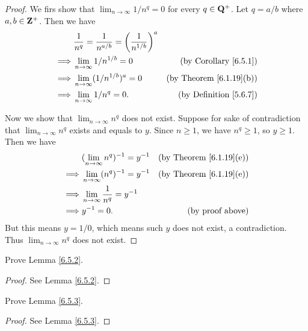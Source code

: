 \begin{proof}
    We firs show that \(\lim_{n \to \infty} 1 / n^q = 0\) for every \(q \in \mathbf{Q}^+\).
    Let \(q = a / b\) where \(a, b \in \mathbf{Z}^+\).
    Then we have
    \begin{align*}
                 & \frac{1}{n^q} = \frac{1}{n^{a / b}} = \bigg(\frac{1}{n^{1 / b}}\bigg)^a                                       \\
        \implies & \lim_{n \to \infty} 1 / n^{1 / b} = 0                                   & \text{(by Corollary \ref{6.5.1})}   \\
        \implies & \lim_{n \to \infty} (1 / n^{1 / b})^a = 0                               & \text{(by Theorem \ref{6.1.19}(b))} \\
        \implies & \lim_{n \to \infty} 1 / n^q = 0.                                        & \text{(by Definition \ref{5.6.7})}
    \end{align*}

    Now we show that \(\lim_{n \to \infty} n^q\) does not exist.
    Suppose for sake of contradiction that \(\lim_{n \to \infty} n^q\) exists and equals to \(y\).
    Since \(n \geq 1\), we have \(n^q \geq 1\), so \(y \geq 1\).
    Then we have
    \begin{align*}
                 & (\lim_{n \to \infty} n^q)^{-1} = y^{-1}    & \text{(by Theorem \ref{6.1.19}(e))} \\
        \implies & \lim_{n \to \infty} (n^q)^{-1} = y^{-1}    & \text{(by Theorem \ref{6.1.19}(e))} \\
        \implies & \lim_{n \to \infty} \frac{1}{n^q} = y^{-1}                                       \\
        \implies & y^{-1} = 0.                                & \text{(by proof above)}
    \end{align*}
    But this means \(y = 1 / 0\), which means such \(y\) does not exist, a contradiction.
    Thus \(\lim_{n \to \infty} n^q\) does not exist.
\end{proof}

\begin{exercise}\label{ex 6.5.2}
    Prove Lemma \ref{6.5.2}.
\end{exercise}

\begin{proof}
    See Lemma \ref{6.5.2}.
\end{proof}

\begin{exercise}\label{ex 6.5.3}
    Prove Lemma \ref{6.5.3}.
\end{exercise}

\begin{proof}
    See Lemma \ref{6.5.3}.
\end{proof}